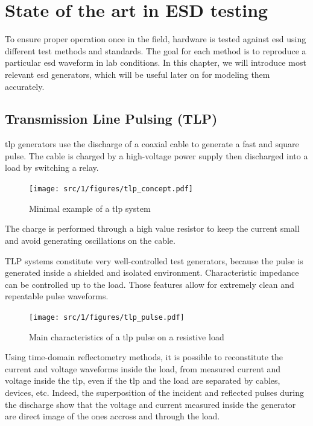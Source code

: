 \section{State of the art in ESD testing}

To ensure proper operation once in the field, hardware is tested against \gls{esd} using different test methods and standards.
The goal for each method is to reproduce a particular \gls{esd} waveform in lab conditions.
In this chapter, we will introduce most relevant \gls{esd} generators, which will be useful later on for modeling them accurately.

\subsection{Transmission Line Pulsing (TLP)}

\gls{tlp} generators use the discharge of a coaxial cable to generate a fast and square pulse.
The cable is charged by a high-voltage power supply then discharged into a load by switching a relay.

\begin{figure}[h]
  \centering
  \texttt{[image: src/1/figures/tlp\_concept.pdf]}
  \caption{Minimal example of a \gls{tlp} system}
  \label{tlp_concept}
\end{figure}

The charge is performed through a high value resistor to keep the current small and avoid generating oscillations on the cable.

TLP systems constitute very well-controlled test generators, because the pulse is generated inside a shielded and isolated environment.
Characteristic impedance can be controlled up to the load.
Those features allow for extremely clean and repeatable pulse waveforms.

\begin{figure}[h]
  \centering
  \texttt{[image: src/1/figures/tlp\_pulse.pdf]}
  \caption{Main characteristics of a \gls{tlp} pulse on a resistive load}
  \label{tlp_pulse}
\end{figure}

Using time-domain reflectometry methods, it is possible to reconstitute the current and voltage waveforms inside the load,
from measured current and voltage inside the \gls{tlp}, even if the \gls{tlp} and the load are separated by cables, devices, etc.
Indeed, the superposition of the incident and reflected pulses during the discharge show that the voltage and current
measured inside the generator are direct image of the ones accross and through the load.

